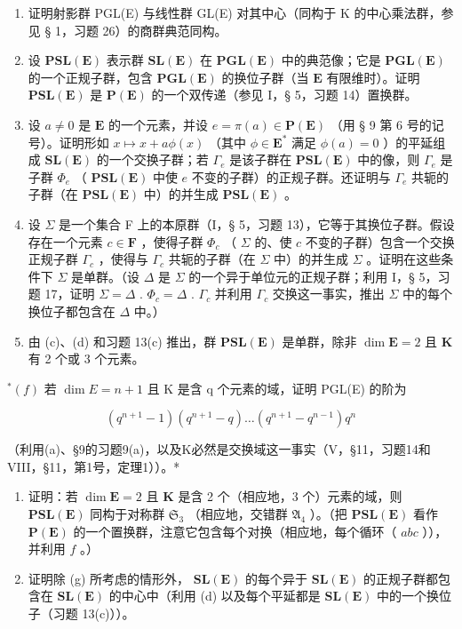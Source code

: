 \begin{enumerate}
\def\labelenumi{(\alph{enumi})}
\item
  证明射影群 PGL(E) 与线性群 GL(E) 对其中心（同构于 K 的中心乘法群，参见 § 1，习题 26）的商群典范同构。
\item
  设 \(\mathbf{PSL}(\mathbf{E})\) 表示群 \(\mathbf{SL}(\mathbf{E})\) 在 \(\mathbf{PGL}(\mathbf{E})\) 中的典范像；它是 \(\mathbf{PGL}(\mathbf{E})\) 的一个正规子群，包含 \(\mathbf{PGL}(\mathbf{E})\) 的换位子群（当 \(\mathbf{E}\) 有限维时）。证明 \(\mathbf{PSL}(\mathbf{E})\) 是 \(\mathbf{P}(\mathbf{E})\) 的一个双传递（参见 I，§ 5，习题 14）置换群。
\item
  设 \(a \neq 0\) 是 \(\mathbf{E}\) 的一个元素，并设 \(e = \pi(a) \in \mathbf{P}(\mathbf{E})\) （用 § 9 第 6 号的记号）。证明形如 \(x \mapsto x + a\phi(x)\) （其中 \(\phi \in \mathbf{E}^*\) 满足 \(\phi(a) = 0\) ）的平延组成 \(\mathbf{SL}(\mathbf{E})\) 的一个交换子群；若 \(\Gamma_e\) 是该子群在 \(\mathbf{PSL}(\mathbf{E})\) 中的像，则 \(\Gamma_e\) 是子群 \(\Phi_e\) （ \(\mathbf{PSL}(\mathbf{E})\) 中使 \(e\) 不变的子群）的正规子群。还证明与 \(\Gamma_e\) 共轭的子群（在 \(\mathbf{PSL}(\mathbf{E})\) 中）的并生成 \(\mathbf{PSL}(\mathbf{E})\) 。
\item
  设 \(\Sigma\) 是一个集合 F 上的本原群（I，§ 5，习题 13），它等于其换位子群。假设存在一个元素 \(c \in \mathbf{F}\) ，使得子群 \(\Phi_c\) （ \(\Sigma\) 的、使 \(c\) 不变的子群）包含一个交换正规子群 \(\Gamma_c\) ，使得与 \(\Gamma_c\) 共轭的子群（在 \(\Sigma\) 中）的并生成 \(\Sigma\) 。证明在这些条件下 \(\Sigma\) 是单群。（设 \(\Delta\) 是 \(\Sigma\) 的一个异于单位元的正规子群；利用 I，§ 5，习题 17，证明 \(\Sigma = \Delta\) . \(\Phi_c = \Delta\) . \(\Gamma_c\) 并利用 \(\Gamma_c\) 交换这一事实，推出 \(\Sigma\) 中的每个换位子都包含在 \(\Delta\) 中。）
\item
  由 (c)、(d) 和习题 13(c) 推出，群 \(\mathbf{PSL}(\mathbf{E})\) 是单群，除非 \(\dim \mathbf{E} = 2\) 且 \(\mathbf{K}\) 有 2 个或 3 个元素。
\end{enumerate}

\(^{*}(f)\) 若 \(\dim E = n + 1\) 且 K 是含 q 个元素的域，证明 PGL(E) 的阶为

\[
(q ^ {n + 1} - 1) (q ^ {n + 1} - q) \dots (q ^ {n + 1} - q ^ {n - 1}) q ^ {n}
\]

（利用(a)、§9的习题9(a)，以及K必然是交换域这一事实（V，§11，习题14和VIII，§11，第1号，定理1））。*

\begin{enumerate}
\def\labelenumi{(\alph{enumi})}
\setcounter{enumi}{6}
\item
  证明：若 \(\dim \mathbf{E} = 2\) 且 \(\mathbf{K}\) 是含 2 个（相应地，3 个）元素的域，则 \(\mathbf{PSL}(\mathbf{E})\) 同构于对称群 \(\mathfrak{S}_3\) （相应地，交错群 \(\mathfrak{A}_4\) ）。（把 \(\mathbf{PSL}(\mathbf{E})\) 看作 \(\mathbf{P}(\mathbf{E})\) 的一个置换群，注意它包含每个对换（相应地，每个循环（ \(a b c\) ）），并利用 \(f\) 。）
\item
  证明除 (g) 所考虑的情形外， \(\mathbf{SL}(\mathbf{E})\) 的每个异于 \(\mathbf{SL}(\mathbf{E})\) 的正规子群都包含在 \(\mathbf{SL}(\mathbf{E})\) 的中心中（利用 (d) 以及每个平延都是 \(\mathbf{SL}(\mathbf{E})\) 中的一个换位子（习题 13(c)））。
\end{enumerate}

